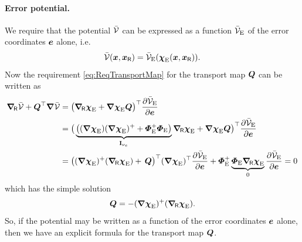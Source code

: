\paragraph{Error potential.} 
We require that the potential $\potentialEnergyC$ can be expressed as a function $\potentialEnergyC_{\idxErr}$ of the error coordinates $\sysCoordE$ alone, i.e.\
\begin{align}
 \potentialEnergyC(\sysCoord, \sysCoordR) = \potentialEnergyC_{\idxErr}(\sysCoordFktE(\sysCoord, \sysCoordR)).
\end{align}
Now the requirement \eqref{eq:ReqTransportMap} for the transport map $\sysTransportMap$ can be written as
\begin{align}
 \differentialR \potentialEnergyC + \sysTransportMap^\top \differential \potentialEnergyC
 &= \big( \differentialR \sysCoordFktE + \differential \sysCoordFktE \sysTransportMap \big)^\top \pdiff[\potentialEnergyC_\idxErr]{\sysCoordE}
\nonumber\\
 &= \big( \underbrace{\big( (\differential \sysCoordFktE) (\differential \sysCoordFktE)^+ + \geoConstraintMatE^+ \geoConstraintMatE \big)}_{\idMat[\numCoordE]} \differentialR \sysCoordFktE + \differential \sysCoordFktE \sysTransportMap \big)^\top \pdiff[\potentialEnergyC_\idxErr]{\sysCoordE}
\nonumber\\
 &= \big( (\differential \sysCoordFktE)^+ (\differentialR \sysCoordFktE) +\,\sysTransportMap \big)^\top (\differential \sysCoordFktE)^\top \pdiff[\potentialEnergyC_\idxErr]{\sysCoordE}
 + \geoConstraintMatE^+ \underbrace{\geoConstraintMatE \differentialR \sysCoordFktE}_{0}  \pdiff[\potentialEnergyC_\idxErr]{\sysCoordE}
 = 0
\end{align}
which has the simple solution
\begin{align}\label{eq:DefErrorTransportMap}
 \sysTransportMap = -(\differential \sysCoordFktE)^+ (\differentialR \sysCoordFktE).
\end{align}
So, if the potential may be written as a function of the error coordinates $\sysCoordE$ alone, then we have an explicit formula for the transport map $\sysTransportMap$.

